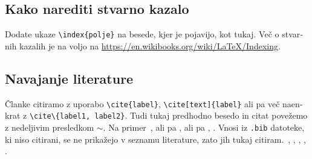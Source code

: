 \documentclass[12pt,a4paper,twoside]{article}
\newcommand{\literatura}{literatura}  %
\theoremstyle{definition} %
\theoremstyle{plain} %
\numberwithin{equation}{section}  %
\begin{document}
\begin{otherlanguage}{slovene}
\subsection{Kako narediti stvarno kazalo}
Dodate ukaze \verb|\index{polje}| na besede, kjer je pojavijo, kot tukaj.
Več o stvarnih kazalih je na voljo na \url{https://en.wikibooks.org/wiki/LaTeX/Indexing}.

\subsection{Navajanje literature}
Članke citiramo z uporabo \verb|\cite{label}|, \verb|\cite[text]{label}| ali pa več naenkrat z
\verb|\cite\{label1, label2}|. Tudi tukaj predhodno besedo in citat povežemo z nedeljivim presledkom
$\sim$. Na primer~\cite{chen2006meshless,liu2001point}, ali pa \cite{kibriya2007empirical}, ali pa
\cite[str.\ 12]{trobec2015parallel}, \cite[enačba (2.3)]{pereira2016convergence}.
Vnosi iz \verb|.bib| datoteke, ki niso citirani, se ne prikažejo v seznamu literature, zato jih
tukaj citiram.~\cite{vene2000categorical}, \cite{gregoric2017stopniceni}, \cite{slak2015induktivni}, \cite{nsphere}, \cite{kearsley1975linearly}.

\end{otherlanguage}

\cleardoublepage                           %

\printindex
\end{document}
